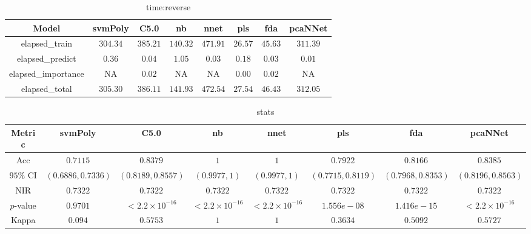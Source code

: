 \begin{table}[!ht]
	\centering
	\begin{tabular}{|c|c|c|c|c|c|c|c|}
		\hline
		Model & svmPoly & C5.0 & nb & nnet & pls & fda & pcaNNet \\ \hline
		elapsed_train & $304.34$ & $385.21$ & $140.32$ & $471.91$ & $26.57$ & $45.63$ & $311.39$ \\ \hline
		elapsed_predict & $0.36$ & $0.04$ & $1.05$ & $0.03$ & $0.18$ & $0.03$ & $0.01$ \\ \hline
		elapsed_importance & NA & $0.02$ & NA & NA & $0.00$ & $0.02$ & NA \\ \hline
		elapsed_total & $305.30$ & $386.11$ & $141.93$ & $472.54$ & $27.54$ & $46.43$ & $312.05$ \\ \hline
	\end{tabular}
	\caption{time:reverse}
	\label{tab:time:reverse}
\end{table}

\begin{table}[!ht]
	\centering
	\begin{tabular}{|c|c|c|c|c|c|c|c|}
		\hline
		Metric & svmPoly & C5.0 & nb & nnet & pls & fda & pcaNNet \\ \hline
		Acc & $0.7115$ & $0.8379$ & $1$ & $1$ & $0.7922$ & $0.8166$ & $0.8385$ \\ \hline
		$95\%$ CI & $(0.6886, 0.7336)$ & $(0.8189, 0.8557)$ & $(0.9977, 1)$ & $(0.9977, 1)$ & $(0.7715, 0.8119)$ & $(0.7968, 0.8353)$ & $(0.8196, 0.8563)$ \\ \hline
		NIR & $0.7322$ & $0.7322$ & $0.7322$ & $0.7322$ & $0.7322$ & $0.7322$ & $0.7322$ \\ \hline
		$p$-value & $0.9701$ & $< 2.2 \times {10}^{-16}$ & $< 2.2 \times {10}^{-16}$ & $< 2.2 \times {10}^{-16}$ & $1.556e-08$ & $1.416e-15$ & $< 2.2 \times {10}^{-16}$ \\ \hline
		Kappa & $0.094$ & $0.5753$ & $1$ & $1$ & $0.3634$ & $0.5092$ & $0.5727$ \\ \hline
	\end{tabular}
	\caption{stats}
	\label{tab:stats}
\end{table}

